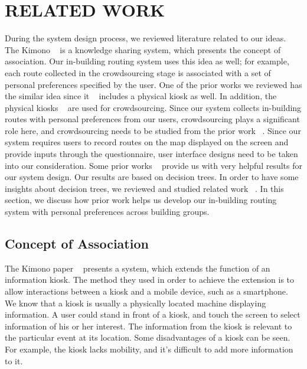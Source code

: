 \documentclass{sigchi}
\begin{document}
\section{RELATED WORK}

During the system design process, we reviewed literature related to our ideas. The Kimono ~\cite{huang2005kimono} is a knowledge sharing system, which presents the concept of association. Our in-building routing system uses this idea as well; for example, each route collected in the crowdsourcing stage is associated with a set of personal preferences specified by the user. One of the prior works we reviewed has the similar idea since it ~\cite{heimerl2012communitysourcing} includes a physical kiosk as well. In addition, the physical kiosks ~\cite{heimerl2012communitysourcing} are used for crowdsourcing. Since our system collects in-building routes with personal preferences from our users, crowdsourcing plays a significant role here, and crowdsourcing needs to be studied from the prior work ~\cite{howe2006rise,ipeirotis2014quizz,alt2010location}. Since our system requires users to record routes on the map displayed on the screen and provide inputs through the questionnaire, user interface designs need to be taken into our consideration. Some prior works ~\cite{della2013crowdsourcing,vaataja2011crowdsourced} provide us with very helpful results for our system design. Our results are based on decision trees. In order to have some insights about decision trees, we reviewed and studied related work ~\cite{su2006fast,quinlan1987simplifying}. In this section, we discuss how prior work helps us develop our in-building routing system with personal preferences across building groups. 


\subsection{Concept of Association}

The Kimono paper ~\cite{huang2005kimono} presents a system, which extends the function of an information kiosk. The method they used in order to achieve the extension is to allow interactions between a kiosk and a mobile device, such as a smartphone. We know that a kiosk is usually a physically located machine displaying information. A user could stand in front of a kiosk, and touch the screen to select information of his or her interest. The information from the kiosk is relevant to the particular event at its location. Some disadvantages of a kiosk can be seen. For example, the kiosk lacks mobility, and it’s difficult to add more information to it.
\end{document}
